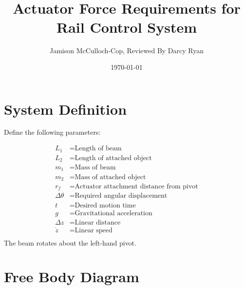 \documentclass[11pt]{article}
\title{Actuator Force Requirements for Rail Control System}
\author{Jamison McCulloch-Cop, Reviewed By Darcy Ryan}
\date{\today}
\begin{document}
\maketitle

\section{System Definition}

Define the following parameters:

\begin{align*}
    L_1 &= \text{Length of beam} \\
    L_2 &= \text{Length of attached object} \\
    m_1 &= \text{Mass of beam} \\
    m_2 &= \text{Mass of attached object} \\
    r_f &= \text{Actuator attachment distance from pivot} \\
    \Delta\theta &= \text{Required angular displacement} \\
    t &= \text{Desired motion time} \\
    g &= \text{Gravitational acceleration}\\
    \Delta z &= \text{Linear distance} \\
    \dot{z} &= \text{Linear speed} \\
\end{align*}
The beam rotates about the left-hand pivot.



\section{Free Body Diagram}
\end{document}
